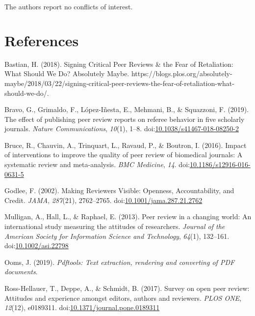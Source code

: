 \documentclass[,jou, a4paper,floatsintext]{apa6}
\begin{document}
The authors report no conflicts of interest.

\hypertarget{references}{%
\section{References}\label{references}}

\setlength{\parindent}{-0.5in}
\setlength{\leftskip}{0.5in}

\hypertarget{refs}{}
\leavevmode\hypertarget{ref-bastian_signing_2018}{}%
Bastian, H. (2018). Signing Critical Peer Reviews \& the Fear of Retaliation: What Should We Do? \textbar{} Absolutely Maybe. https://blogs.plos.org/absolutely-maybe/2018/03/22/signing-critical-peer-reviews-the-fear-of-retaliation-what-should-we-do/.

\leavevmode\hypertarget{ref-bravo_effect_2019}{}%
Bravo, G., Grimaldo, F., López-Iñesta, E., Mehmani, B., \& Squazzoni, F. (2019). The effect of publishing peer review reports on referee behavior in five scholarly journals. \emph{Nature Communications}, \emph{10}(1), 1--8. doi:\href{https://doi.org/10.1038/s41467-018-08250-2}{10.1038/s41467-018-08250-2}

\leavevmode\hypertarget{ref-bruce_impact_2016}{}%
Bruce, R., Chauvin, A., Trinquart, L., Ravaud, P., \& Boutron, I. (2016). Impact of interventions to improve the quality of peer review of biomedical journals: A systematic review and meta-analysis. \emph{BMC Medicine}, \emph{14}. doi:\href{https://doi.org/10.1186/s12916-016-0631-5}{10.1186/s12916-016-0631-5}

\leavevmode\hypertarget{ref-godlee_making_2002}{}%
Godlee, F. (2002). Making Reviewers Visible: Openness, Accountability, and Credit. \emph{JAMA}, \emph{287}(21), 2762--2765. doi:\href{https://doi.org/10.1001/jama.287.21.2762}{10.1001/jama.287.21.2762}

\leavevmode\hypertarget{ref-mulligan_peer_2013}{}%
Mulligan, A., Hall, L., \& Raphael, E. (2013). Peer review in a changing world: An international study measuring the attitudes of researchers. \emph{Journal of the American Society for Information Science and Technology}, \emph{64}(1), 132--161. doi:\href{https://doi.org/10.1002/asi.22798}{10.1002/asi.22798}

\leavevmode\hypertarget{ref-ooms_pdftools_2019}{}%
Ooms, J. (2019). \emph{Pdftools: Text extraction, rendering and converting of PDF documents}.

\leavevmode\hypertarget{ref-ross-hellauer_survey_2017}{}%
Ross-Hellauer, T., Deppe, A., \& Schmidt, B. (2017). Survey on open peer review: Attitudes and experience amongst editors, authors and reviewers. \emph{PLOS ONE}, \emph{12}(12), e0189311. doi:\href{https://doi.org/10.1371/journal.pone.0189311}{10.1371/journal.pone.0189311}
\end{document}
